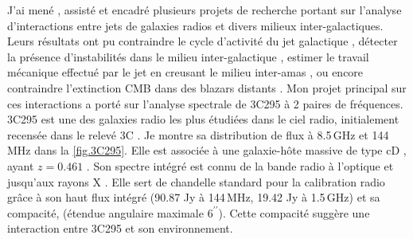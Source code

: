 \pg
J'ai men\'e \cite{2022A&A...658A..10B}, assist\'e \cite{2022A&A...661A..92B} et encadr\'e \cite{2021A&A...650A.170B,2022A&A...663A..44K} plusieurs projets de recherche portant sur l'analyse d'interactions entre jets de galaxies radios et divers milieux inter-galactiques. Leurs r\'esultats ont pu contraindre le cycle d'activit\'e du jet galactique \cite{2022A&A...661A..92B}, d\'etecter la pr\'esence d'instabilit\'es dans le milieu inter-galactique \cite{2022A&A...661A..92B}, estimer le travail m\'ecanique effectu\'e par le jet en creusant le milieu inter-amas \cite{2021A&A...650A.170B}, ou encore contraindre l'extinction CMB dans des blazars distants \cite{2022A&A...663A..44K}. Mon projet principal sur ces interactions \cite{2022A&A...658A..10B} a port\'e sur l'analyse spectrale de 3C295 \`a 2 paires de fr\'equences. 
3C295 est une des galaxies radio les plus \'etudi\'ees dans le ciel radio, initialement recens\'ee dans le relev\'e 3C \cite{1959MmRAS..68...37E}. Je montre sa distribution de flux \`a 8.5\,GHz et 144\,MHz dans la \cref{fig.3C295}. Elle est associ\'ee \`a une galaxie-h\^ote massive de type cD \cite{1981ApJ...251..485M}, ayant $z=0.461$ \cite{2013yCat.5139....0A}. Son spectre int\'egr\'e est connu de la bande radio \cite{1990MNRAS.244..362A,1991AJ....101.1623P, 1983IEEEP..71.1295N,2011ApJ...739L...1P} \`a l'optique \cite[e.g.][]{1994A&A...285..785T} et jusqu'aux rayons X \cite[e.g.][]{2000ApJ...530L..81H,2001A&A...372..755B}. Elle sert de chandelle standard pour la calibration radio \cite{2012MNRAS.423L..30S,2017ApJS..230....7P} gr\^ace \`a son haut flux int\'egr\'e (90.87 Jy \`a 144\,MHz, 19.42 Jy \`a 1.5\,GHz) et sa compacit\'e, (\'etendue angulaire maximale $6^{\prime\prime}$). Cette compacit\'e sugg\`ere une interaction entre 3C295 et son environnement.%


\vspace{-0.5cm}

